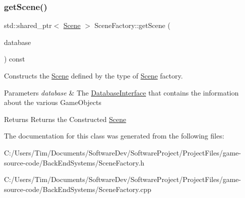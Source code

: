 \subsubsection{\texorpdfstring{get\+Scene()}{getScene()}}
{\footnotesize\ttfamily std\+::shared\+\_\+ptr$<$ \hyperlink{class_scene}{Scene} $>$ Scene\+Factory\+::get\+Scene (\begin{DoxyParamCaption}\item[{std\+::shared\+\_\+ptr$<$ \hyperlink{class_database_interface}{Database\+Interface} $>$}]{database }\end{DoxyParamCaption}) const}



Constructs the \hyperlink{class_scene}{Scene} defined by the type of \hyperlink{class_scene}{Scene} factory. 


\begin{DoxyParams}{Parameters}
{\em database} & The \hyperlink{class_database_interface}{Database\+Interface} that contains the information about the various Game\+Objects \\
\hline
\end{DoxyParams}
\begin{DoxyReturn}{Returns}
Returns the Constructed \hyperlink{class_scene}{Scene} 
\end{DoxyReturn}


The documentation for this class was generated from the following files\+:\begin{DoxyCompactItemize}
\item 
C\+:/\+Users/\+Tim/\+Documents/\+Software\+Dev/\+Software\+Project/\+Project\+Files/game-\/source-\/code/\+Back\+End\+Systems/Scene\+Factory.\+h\item 
C\+:/\+Users/\+Tim/\+Documents/\+Software\+Dev/\+Software\+Project/\+Project\+Files/game-\/source-\/code/\+Back\+End\+Systems/Scene\+Factory.\+cpp\end{DoxyCompactItemize}
